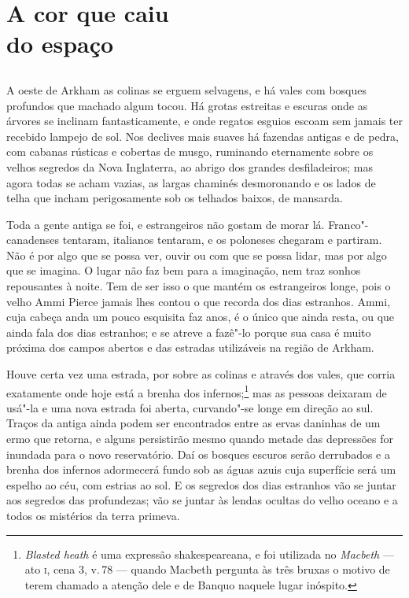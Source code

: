 \baselineskip
{}

\part[A cor que caiu do espaço]{A cor que caiu\\do espaço}

\chapter*{}
A oeste de Arkham as colinas se erguem selvagens, e há vales com bosques
profundos que machado algum tocou. Há grotas estreitas e escuras onde as
árvores se inclinam fantasticamente, e onde regatos esguios escoam sem
jamais ter recebido lampejo de sol. Nos declives mais suaves há fazendas
antigas e de pedra, com cabanas rústicas e cobertas de musgo, ruminando
eternamente sobre os velhos segredos da Nova Inglaterra, ao abrigo dos
grandes desfiladeiros; mas agora todas se acham vazias, as largas
chaminés desmoronando e os lados de telha que incham perigosamente sob
os telhados baixos, de mansarda.

Toda a gente antiga se foi, e estrangeiros não gostam de morar lá.
Franco"-canadenses tentaram, italianos tentaram, e os poloneses chegaram
e partiram. Não é por algo que se possa ver, ouvir ou com que se possa
lidar, mas por algo que se imagina. O lugar não faz bem para a
imaginação, nem traz sonhos repousantes à noite. Tem de ser isso o que
mantém os estrangeiros longe, pois o velho Ammi Pierce jamais lhes
contou o que recorda dos dias estranhos. Ammi, cuja cabeça anda um pouco
esquisita faz anos, é o único que ainda resta, ou que ainda fala dos
dias estranhos; e se atreve a fazê"-lo porque sua casa é muito próxima
dos campos abertos e das estradas utilizáveis na região de Arkham.

Houve certa vez uma estrada, por sobre as colinas e através dos vales,
que corria exatamente onde hoje está a brenha dos infernos;\footnote{\textit{Blasted
  heath} é uma expressão shakespeareana, e foi utilizada no
  \textit{Macbeth} --- ato \textsc{i}, cena 3, v.\,78 --- quando Macbeth pergunta às três
  bruxas o motivo de terem chamado a atenção dele e de Banquo naquele
  lugar inóspito.} mas as pessoas deixaram de usá"-la e uma nova estrada
foi aberta, curvando"-se longe em direção ao sul. Traços da antiga ainda
podem ser encontrados entre as ervas daninhas de um ermo que retorna, e
alguns persistirão mesmo quando metade das depressões for inundada para
o novo reservatório. Daí os bosques escuros serão derrubados e a brenha
dos infernos adormecerá fundo sob as águas azuis cuja superfície será um
espelho ao céu, com estrias ao sol. E os segredos dos dias estranhos vão
se juntar aos segredos das profundezas; vão se juntar às lendas ocultas
do velho oceano e a todos os mistérios da terra primeva.

